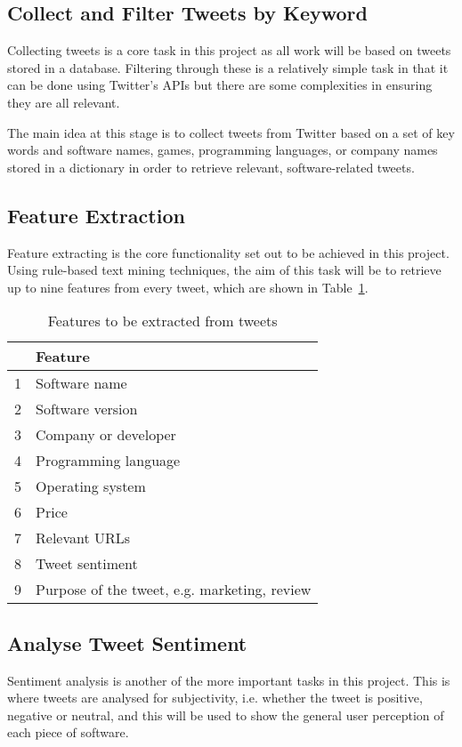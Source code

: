 \subsection{Collect and Filter Tweets by Keyword}
Collecting tweets is a core task in this project as all work will be based on tweets stored in a database. Filtering through these is a relatively simple task in that it can be done using Twitter's APIs but there are some complexities in ensuring they are all relevant.

The main idea at this stage is to collect tweets from Twitter based on a set of key words and software names, games, programming languages, or company names stored in a dictionary in order to retrieve relevant, software-related tweets.

\subsection{Feature Extraction}
Feature extracting is the core functionality set out to be achieved in this project. Using rule-based text mining techniques, the aim of this task will be to retrieve up to nine features from every tweet, which are shown in Table~\ref{features}.

\begin{table}
\begin{center}
\begin{tabular}{|r|l|}\hline\hline
&Feature\\\hline
1&Software name\\
2&Software version\\
3&Company or developer\\
4&Programming language\\
5&Operating system\\
6&Price\\
7&Relevant URLs\\
8&Tweet sentiment\\
9&Purpose of the tweet, e.g. marketing, review\\\hline\hline
\end{tabular}
\end{center}
\caption{Features to be extracted from tweets}\label{features}
\end{table}


\subsection{Analyse Tweet Sentiment}
Sentiment analysis is another of the more important tasks in this project. This is where tweets are analysed for subjectivity, i.e. whether the tweet is positive, negative or neutral, and this will be used to show the general user perception of each piece of software.

